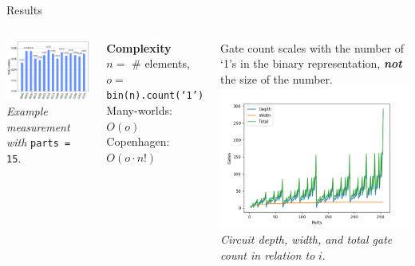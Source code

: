 \documentclass{beamer}
\begin{document}
   \begin{frame}{Results}
       \begin{columns}
           \begin{center}
           \includegraphics[width=\linewidth]{images/example_measurement.png}
           \textit{Example measurement with }\texttt{parts = 15}. \\
           \end{center}
           \textbf{Complexity} \\
           $n =$ \# elements, $o =$ \texttt{bin(n).count(`1')} \\
           Many-worlds: $O(o)$ \\
           Copenhagen: $O(o \cdot n!)$
           
           Gate count scales with the number of `1's in the binary representation, \textit{\textbf{not}} the size of the number.
           \includegraphics[width=\linewidth]{images/resources.png}
           \textit{Circuit depth, width, and total gate count in relation to} $ i $.
       \end{columns}
   \end{frame}
  
\end{document}
